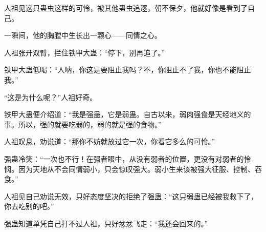 \begin{this_body}
人祖见这只蛊虫这样的可怜，被其他蛊虫追逐，朝不保夕，他就好像是看到了自己。

一瞬间，他的胸膛中生长出一颗心——同情之心。

人祖张开双臂，拦住铁甲大蛊：“停下，别再追了。”

铁甲大蛊低喝：“人呐，你这是要阻止我吗？不，你阻止不了我，你也不能阻止我。”

“这是为什么呢？”人祖好奇。

铁甲大蛊便介绍道：“我是强蛊，它是弱蛊。自古以来，弱肉强食是天经地义的事。所以，强的就要吃弱的，弱的就是强的食物。”

人祖叹息，劝说道：“那你不妨就放过它一次，你看它多么的可怜。”

强蛊冷笑：“一次也不行！在强者眼中，从没有弱者的位置，更没有对弱者的怜悯。因为天地从不会同情弱小，只会惊叹强大。弱小生来该被强大征服、控制、吞食。”

人祖见自己劝说无效，只好态度坚决的拒绝了强蛊：“这只弱蛊已经被我救下了，你去吃别的吧。”

强蛊知道单凭自己打不过人祖，只好忿忿飞走：“我还会回来的。”

\end{this_body}

